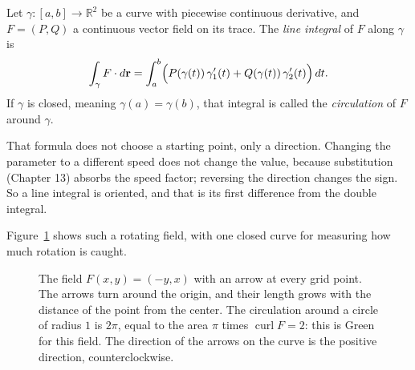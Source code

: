 \begin{definisi}
Let $\gamma\colon[a,b]\to\mathbb{R}^{2}$ be a curve with piecewise continuous
derivative, and $F=(P,Q)$ a continuous vector field on its trace.
The \emph{line integral} of $F$ along $\gamma$ is
\[
\int_{\gamma}F\cdot d\mathbf{r}
=\int_{a}^{b}\Bigl(P(\gamma(t))\,\gamma_{1}'(t)
+Q(\gamma(t))\,\gamma_{2}'(t)\Bigr)\,dt .
\]
If $\gamma$ is closed, meaning $\gamma(a)=\gamma(b)$, that integral is called
the \emph{circulation} of $F$ around $\gamma$.
\end{definisi}

That formula does not choose a starting point, only a direction. Changing the parameter to a
different speed does not change the value, because substitution (Chapter 13) absorbs
the speed factor; reversing the direction changes the sign. So a line integral is oriented,
and that is its first difference from the double integral.

Figure~\ref{fig:sirkulasi} shows such a rotating field, with one
closed curve for measuring how much rotation is caught.

\begin{figure}[htbp]
\centering
{}
\caption{The field $F(x,y)=(-y,x)$ with an arrow at every grid point. The arrows turn
around the origin, and their length grows with the distance of the point from the center. The circulation
around a circle of radius $1$ is $2\pi$, equal to the area $\pi$ times
$\operatorname{curl}F=2$: this is Green for this field. The direction of the arrows on the curve is the positive
direction, counterclockwise.}
\label{fig:sirkulasi}
\end{figure}

